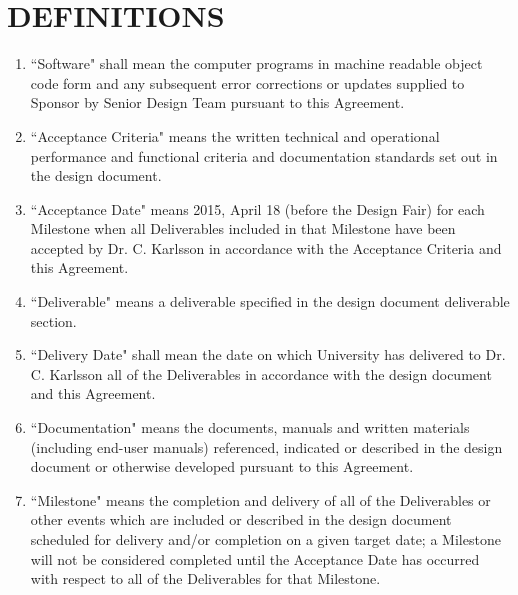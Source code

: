 \documentclass[11pt]{article}
\begin{document}
\section{DEFINITIONS }
\begin{enumerate}  \itemsep4pt \parskip0pt 
\item ``Software" shall mean the computer programs in machine readable       object code form and any subsequent error corrections or updates       supplied to Sponsor by Senior Design Team pursuant to this Agreement.

\item ``Acceptance Criteria" means the written technical and operational       performance and functional criteria and documentation standards       set out in the design document.

\item ``Acceptance Date" means 2015, April 18 (before the Design Fair) for each Milestone when all       Deliverables included in that Milestone have been accepted by       Dr. C. Karlsson in accordance with the Acceptance Criteria and this       Agreement.    

\item  ``Deliverable" means a deliverable specified in the design document deliverable section.    

\item  ``Delivery Date" shall mean the date on which University has delivered to Dr. C. Karlsson       all of the Deliverables in accordance with       the design document and this Agreement.

\item  ``Documentation" means the documents, manuals and written materials       (including end-user manuals) referenced, indicated or described       in the design document or otherwise developed pursuant to this       Agreement.    

\item  ``Milestone" means the completion and delivery of all of the       Deliverables or other events which are included or described in       the design document scheduled for delivery and/or completion on a       given target date; a Milestone will not be considered completed       until the Acceptance Date has occurred with respect to all of the       Deliverables for that Milestone.  
\end{enumerate}
\end{document}

